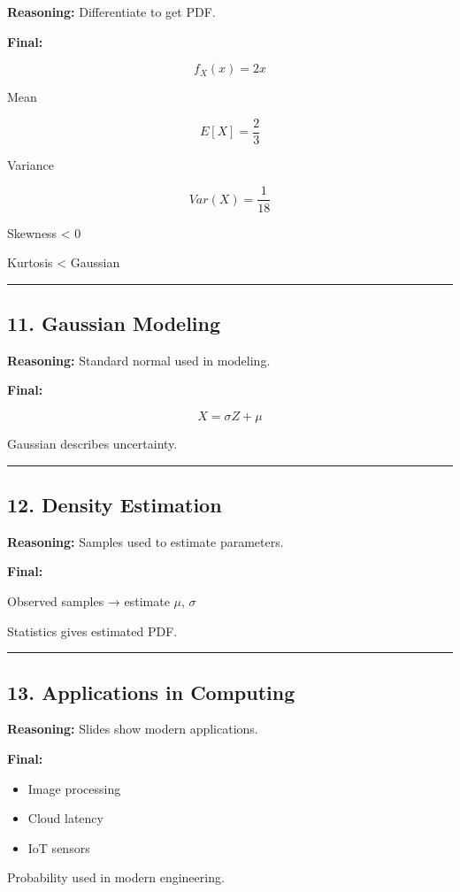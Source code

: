 \documentclass[12pt]{article}
\begin{document}
\textbf{Reasoning:}  
Differentiate to get PDF.

\textbf{Final:}

\[
f_X(x) = 2x
\]

Mean

\[
E[X] = \frac{2}{3}
\]

Variance

\[
Var(X) = \frac{1}{18}
\]

Skewness < 0

Kurtosis < Gaussian

\hrule

\subsection*{11. Gaussian Modeling}

\textbf{Reasoning:}  
Standard normal used in modeling.

\textbf{Final:}

\[
X = \sigma Z + \mu
\]

Gaussian describes uncertainty.

\hrule

\subsection*{12. Density Estimation}

\textbf{Reasoning:}  
Samples used to estimate parameters.

\textbf{Final:}

Observed samples → estimate $\mu$, $\sigma$

Statistics gives estimated PDF.

\hrule

\subsection*{13. Applications in Computing}

\textbf{Reasoning:}  
Slides show modern applications.

\textbf{Final:}

\begin{itemize}
\item Image processing
\item Cloud latency
\item IoT sensors
\end{itemize}

Probability used in modern engineering.
\end{document}
